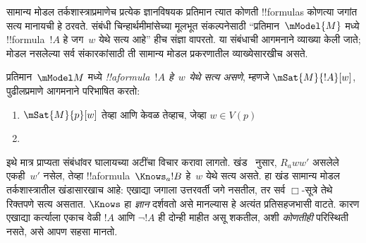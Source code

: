 \documentclass[../../../include/open-logic-section]{subfiles}
\begin{document}


सामान्य मोडल तर्कशास्त्राप्रमाणेच प्रत्येक ज्ञानविषयक
प्रतिमान त्यात कोणती !!{formula}s कोणत्या जगांत सत्य
मानायची हे ठरवते. संबंधी चिन्हार्थमीमांसेच्या मूलभूत
संकल्पनेसाठी ``प्रतिमान~$\mModel{M}$ मध्ये
!!{formula}~$!A$ हे जग~$w$ येथे सत्य आहे'' हीच संज्ञा
वापरतो. या संबंधाची आगमनाने व्याख्या केली जाते;
मोडल नसलेल्या सर्व संकारकांसाठी ती सामान्य मोडल
प्रकरणातील व्याख्येसारखीच असते.

\begin{defn}
  प्रतिमान~$\mModel M$ मध्ये \emph{!!a{formula}~$!A$ हे~$w$ येथे
  सत्य असणे}, म्हणजे $\mSat{M}{!A}[w]$, पुढीलप्रमाणे
  आगमनाने परिभाषित करतो:
  \begin{enumerate}
  \item $\mSat{M}{p}[w]$ तेव्हा आणि केवळ तेव्हाच, जेव्हा $w \in V(p)$
  \item{}
  \end{enumerate}
\end{defn}

इथे मात्र प्राप्यता संबंधांवर घालायच्या अटींचा विचार
करावा लागतो. खंड~ नुसार,
$R_a ww'$ असलेले एकही~$w'$ नसेल, तेव्हा
!!a{formula}~$\Knows_a !B$ हे~$w$ येथे सत्य असते.
हा खंड सामान्य मोडल तर्कशास्त्रातील खंडासारखाच
आहे: एखाद्या जगाला उत्तरवर्ती जगे नसतील, तर सर्व
$\Box$-सूत्रे तेथे रिक्तपणे सत्य असतात. $\Knows$ हा
\emph{ज्ञान} दर्शवतो असे मानल्यास हे अत्यंत
प्रतिसहजभासी वाटते. कारण एखाद्या कर्त्याला एकाच
वेळी $!A$ आणि $\lnot !A$ ही दोन्ही माहीत असू शकतील,
अशी \emph{कोणतीही} परिस्थिती नसते, असे आपण
सहसा मानतो.
\end{document}
